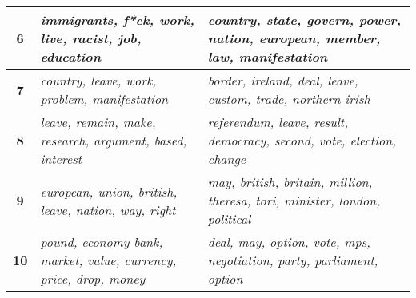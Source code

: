 \begin{table}[tbp]
\begin{tabular}{|c|p{\mywidth}|p{\mywidth}|}
	\cellcolor[HTML]{00BFC4}\textbf{6}     
	& \textit{immigrants, f*ck, work, live, racist, job, education}                    
	& \textit{country, state, govern, power, nation, european, member, law, manifestation}    
	\\ \hline

	\cellcolor[HTML]{00B0F6}\textbf{7}     
	& \textit{country, leave, work, problem, manifestation}                           
	& \textit{border, ireland, deal, leave, custom, trade, northern irish}                    
	\\ \hline

	\cellcolor[HTML]{9590FF}\textbf{8}     
	& \textit{leave, remain, make, research, argument, based, interest}                
	& \textit{referendum, leave, result, democracy, second, vote, election, change}           
	\\ \hline

	\cellcolor[HTML]{E76BF3}\textbf{9}     
	& \textit{european, union, british, leave, nation, way, right}                     
	& \textit{may, british, britain, million, theresa, tori, minister, london, political}     
	\\ \hline

	\cellcolor[HTML]{FF62BC}\textbf{10}    
	& \textit{pound, economy bank, market, value, currency, price, drop, money}        
	& \textit{deal, may, option, vote, mps, negotiation, party, parliament, option}           
	\\ \hline
\end{tabular}%
\end{table}